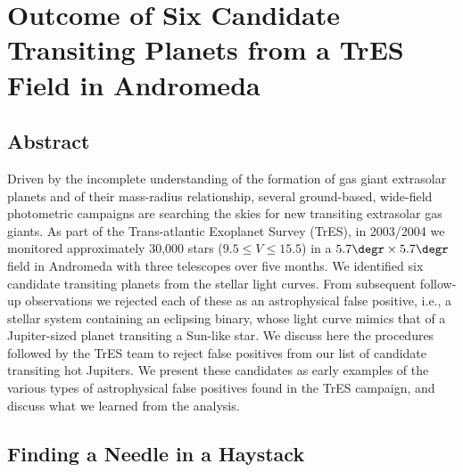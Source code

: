 \chapter[Outcome of Six Candidate Transiting Planets from a TrES Field in Andromeda]{Outcome of Six Candidate Transiting Planets from a TrES Field in Andromeda%
\protect\CFNB%
}
\label{cha:and0}

\section*{Abstract}
\label{cha:and0:sec:abs}

Driven by the incomplete understanding of the formation of gas giant extrasolar planets and of their mass-radius relationship, several ground-based, wide-field photometric campaigns are searching the skies for new transiting extrasolar gas giants. As part of the Trans-atlantic Exoplanet Survey (TrES), in 2003/2004 we monitored approximately 30,000 stars ($9 .5\leq V \leq 15.5$) in a $5.7\degr\times5.7\degr$ field in Andromeda with three telescopes over five months. We identified six candidate transiting planets from the stellar light curves. From subsequent follow-up observations we rejected each of these as an astrophysical false positive, i.e., a stellar system containing an eclipsing binary, whose light curve mimics that of a Jupiter-sized planet transiting a Sun-like star. We discuss here the procedures followed by the TrES team to reject false positives from our list of candidate transiting hot Jupiters. We present these candidates as early examples of the various types of astrophysical false positives found in the TrES campaign, and discuss what we learned from the analysis.

\section{Finding a Needle in a Haystack}
\label{cha:and0:sec:intro}

